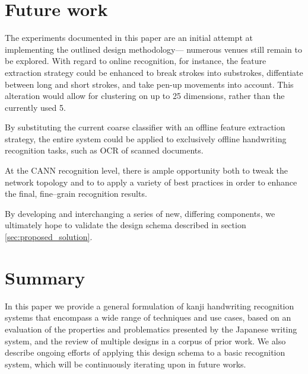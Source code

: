 \documentclass[10pt,conference,a4paper]{IEEEtran}
\begin{document}
	\section{Future work}
	\label{sec:future_work}

	The experiments documented in this paper are an initial attempt at implementing the outlined design methodology---
	numerous venues still remain to be explored. With regard to online recognition, for instance, the feature extraction
	strategy could be enhanced to break strokes into substrokes, diffentiate between long and short strokes, and take
	pen-up movements into account. This alteration would allow for clustering on up to 25 dimensions, rather than the currently used 5.

	By substituting the current coarse classifier with an offline feature extraction strategy, the entire system could
	be applied to exclusively offline handwriting recognition tasks, such as OCR of scanned documents.

	At the CANN recognition level, there is ample opportunity both to tweak the network topology and to 
	to apply a variety of best practices \cite{simard2003best} in order to enhance the final, fine--grain recognition results.

	By developing and interchanging a series of new, differing components, we ultimately hope to validate the design schema described in section \ref{sec:proposed_solution}. 


	\section{Summary}
	\label{sec:summary}

	In this paper we provide a general formulation of kanji handwriting recognition systems that encompass a wide range
	of techniques and use cases, based on an evaluation of the properties and problematics presented by the Japanese writing system,
	and the review of multiple designs in a corpus of prior work. We also describe ongoing efforts
	of applying this design schema to a basic recognition system, which will be continuously iterating upon in future works.



	
\end{document}
